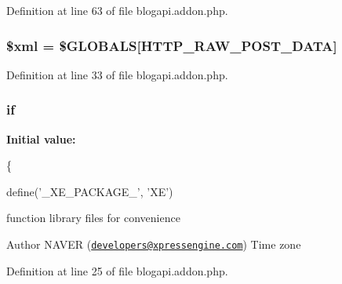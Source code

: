 Definition at line 63 of file blogapi.\+addon.\+php.

\hypertarget{blogapi_8addon_8php_aa108d9d91e700ac530401dd363b0723b}{}
\subsubsection[{\$xml}]{\setlength{\rightskip}{0pt plus 5cm}\$xml = \$G\+L\+O\+B\+A\+L\+S\mbox{[}\textquotesingle{}H\+T\+T\+P\+\_\+\+R\+A\+W\+\_\+\+P\+O\+S\+T\+\_\+\+D\+A\+T\+A\textquotesingle{}\mbox{]}}\label{blogapi_8addon_8php_aa108d9d91e700ac530401dd363b0723b}


Definition at line 33 of file blogapi.\+addon.\+php.

\hypertarget{blogapi_8addon_8php_ae00067f6d78515f89a86a2a7f42cdc80}{}
\subsubsection[{if}]{\setlength{\rightskip}{0pt plus 5cm}if}\label{blogapi_8addon_8php_ae00067f6d78515f89a86a2a7f42cdc80}
{\bfseries Initial value\+:}
\begin{DoxyCode}
\{
    
    define(\textcolor{stringliteral}{'\_XE\_PACKAGE\_'}, \textcolor{stringliteral}{'XE'})
\end{DoxyCode}
function library files for convenience

\begin{DoxyAuthor}{Author}
N\+A\+V\+E\+R (\href{mailto:developers@xpressengine.com}{\tt developers@xpressengine.\+com}) Time zone 
\end{DoxyAuthor}


Definition at line 25 of file blogapi.\+addon.\+php.

